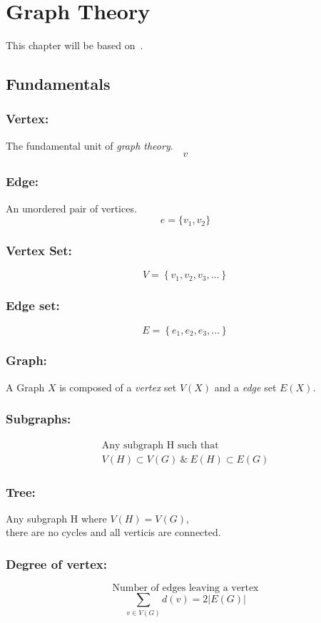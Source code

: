 \documentclass[../../mathematics_cheat_sheet.tex]{subfiles}
\begin{document}
\chapter{Graph Theory}
This chapter will be based on~\citet{GodsilRoyle2001}\cite{GodsilRoyle2001}.
\section{Fundamentals}
\subsection{Vertex:}
The fundamental unit of \emph{graph theory}.
\[v\]
\subsection{Edge:}
An unordered pair of vertices.
\[e=\{v_{1},v_{2}\}\]
\subsection{Vertex Set:}
\[
V=\left\{v_{1}, v_{2}, v_{3}, \ldots\right\}
\]
\subsection{Edge set:}
\[
E=\left\{e_{1}, e_{2}, e_{3}, \ldots\right\}
\]
\subsection{Graph:}
A Graph $X$ is composed of a \emph{vertex} set $V(X)$ and a \emph{edge} set $E(X)$.
\subsection{Subgraphs:}
\[
\begin{array}{cc}
\text{Any subgraph } \mathrm{H} \text{ such that}\\
V(H) \subset V(G) ~\&~ E(H) \subset E(G)
\end{array}
\]
\subsection{Tree:}
\begin{center}
Any subgraph $\mathrm{H}$ where $V(H)=V(G)$,\\ there are no cycles and all verticis are connected.
\end{center}
%
\subsection{Degree of vertex:}
\[\text{Number of edges leaving a vertex}\]
\[\sum_{v \in V(G)} d(v)=2|E(G)| \]
%
%
\end{document}
